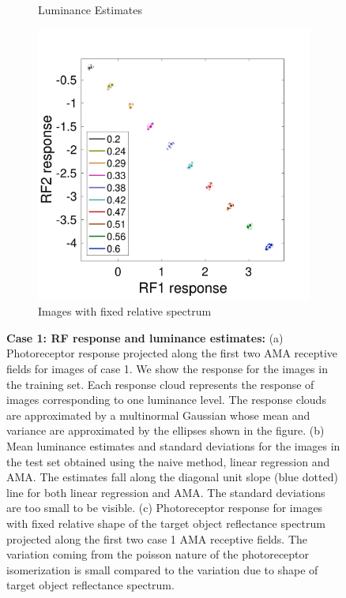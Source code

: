 \documentclass{jov}
\begin{document}
\begin{figure}
\begin{subfigure}[b]{0.297 \textwidth}
        \caption{Luminance Estimates}
        \label{fig:case9Results}
    \end{subfigure}    
        \begin{subfigure}[b]{0.3 \textwidth}
        \includegraphics[width=\textwidth]{../Figures/Figure9/Figure9_c.pdf}
        \caption{Images with fixed relative spectrum}
        \label{fig:case0RFResponse}
    \end{subfigure}
    \caption{{\bf Case 1: RF response and luminance estimates:} (a) Photoreceptor response projected along the first two AMA receptive fields for images of case 1. We show the response for the images in the training set. Each response cloud represents the response of images corresponding to one luminance level. The response clouds are approximated by a multinormal Gaussian whose mean and variance are approximated by the ellipses shown in the figure. (b) Mean luminance estimates and standard deviations for the images in the test set obtained using the naive method, linear regression and AMA. The estimates fall along the diagonal unit slope (blue dotted) line for both linear regression and AMA. The standard deviations are too small to be visible. (c) Photoreceptor response for images with fixed relative shape of the target object reflectance spectrum projected along the first two case 1 AMA receptive fields. The variation coming from the poisson nature of the photoreceptor isomerization is small compared to the variation due to shape of target object reflectance spectrum.}
\label{fig:sourcesOfNoise}
\end{figure}
\end{document}
